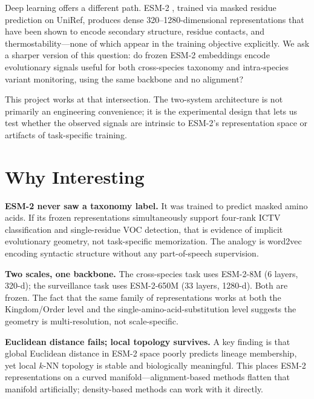 \documentclass{article}
\begin{document}
Deep learning offers a different path. ESM-2 \citep{lin2023esm2}, trained via masked residue prediction on UniRef, produces dense 320--1280-dimensional representations that have been shown to encode secondary structure, residue contacts, and thermostability---none of which appear in the training objective explicitly. We ask a sharper version of this question: do frozen ESM-2 embeddings encode evolutionary signals useful for both cross-species taxonomy and intra-species variant monitoring, using the same backbone and no alignment?

This project works at that intersection. The two-system architecture is not primarily an engineering convenience; it is the experimental design that lets us test whether the observed signals are intrinsic to ESM-2's representation space or artifacts of task-specific training.

\section{Why Interesting}
\label{sec:interesting}

\textbf{ESM-2 never saw a taxonomy label.} It was trained to predict masked amino acids. If its frozen representations simultaneously support four-rank ICTV classification and single-residue VOC detection, that is evidence of implicit evolutionary geometry, not task-specific memorization. The analogy is word2vec encoding syntactic structure without any part-of-speech supervision.

\textbf{Two scales, one backbone.} The cross-species task uses ESM-2-8M (6 layers, 320-d); the surveillance task uses ESM-2-650M (33 layers, 1280-d). Both are frozen. The fact that the same family of representations works at both the Kingdom/Order level and the single-amino-acid-substitution level suggests the geometry is multi-resolution, not scale-specific.

\textbf{Euclidean distance fails; local topology survives.} A key finding is that global Euclidean distance in ESM-2 space poorly predicts lineage membership, yet local $k$-NN topology is stable and biologically meaningful. This places ESM-2 representations on a curved manifold---alignment-based methods flatten that manifold artificially; density-based methods can work with it directly.

\end{document}

